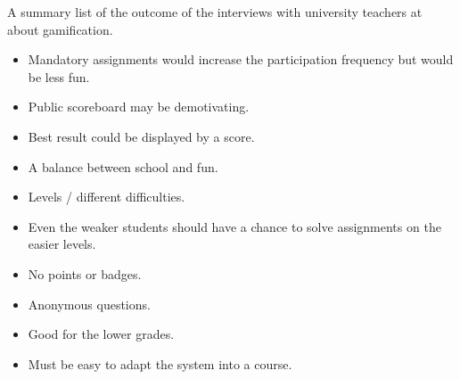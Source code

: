 A summary list of the outcome of the interviews with university teachers at \LTU{} about gamification.
\begin{itemize}
 \item Mandatory assignments would increase the participation frequency but would be less fun.
 \item Public scoreboard may be demotivating.
 \item Best result could be displayed by a score.
 \item A balance between school and fun.
 \item Levels / different difficulties. 
 \item Even the weaker students should have a chance to solve assignments on the easier levels.
 \item No points or badges.
 \item Anonymous questions.
 \item Good for the lower grades.
 \item Must be easy to adapt the system into a course.
\end{itemize}